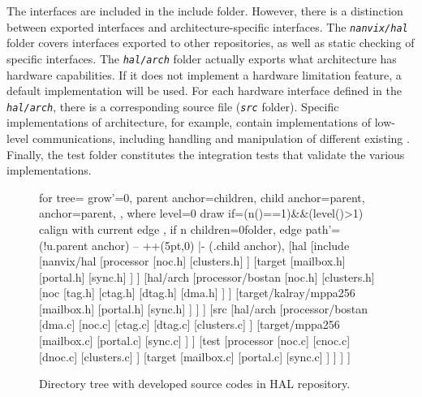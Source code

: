 		The interfaces are included in the include folder. However, there is a
		distinction between exported interfaces and architecture-specific
		interfaces. The \textit{\texttt{nanvix/hal}} folder covers interfaces exported
		to other repositories, as well as static checking of specific interfaces.
		The \textit{\texttt{hal/arch}} folder actually exports what architecture has
		hardware capabilities. If it does not implement a hardware limitation
		feature, a default implementation will be used. For each hardware
		interface defined in the \textit{\texttt{hal/arch}}, there is a corresponding
		source file (\textit{\texttt{src}} folder). Specific implementations of \mppa
		architecture, for example, contain implementations of low-level
		communications, including handling and manipulation of different
		existing \nocs. Finally, the test folder constitutes the integration
		tests that validate the various implementations.

		\begin{figure}[!ht]
			\centering%
			\caption{Directory tree with developed source codes in HAL repository.}%
			\label{fig:tree.hal}%
			\begin{forest}
			for tree={
				grow'=0,
				parent anchor=children,
				child anchor=parent,
				anchor=parent,
			},
			where level=0{
				draw
			}{
				if={(n()==1)&&(level()>1)}{
				calign with current edge
				}{},
				if n children=0{folder}{},
				edge path'={(!u.parent anchor) -- ++(5pt,0) |- (.child anchor)},
			}
			[hal
				[include
					[nanvix/hal
							[processor
								[noc.h]
								[clusters.h]
							]
							[target
								[mailbox.h]
								[portal.h]
								[sync.h]
							]
					]
					[hal/arch
						[processor/bostan
							[noc.h]
							[clusters.h]
							[noc
								[tag.h]
								[ctag.h]
								[dtag.h]
								[dma.h]
							]
						]
						[target/kalray/mppa256
							[mailbox.h]
							[portal.h]
							[sync.h]
						]
					]
				]
				[src
					[hal/arch
							[processor/bostan
								[dma.c]
								[noc.c]
								[ctag.c]
								[dtag.c]
								[clusters.c]
							]
							[target/mppa256
								[mailbox.c]
								[portal.c]
								[sync.c]
							]
					]
					[test
						[processor
							[noc.c]
							[cnoc.c]
							[dnoc.c]
							[clusters.c]
						]
						[target
							[mailbox.c]
							[portal.c]
							[sync.c]
						]
					]
				]
			]
			\end{forest}%
		\end{figure}

